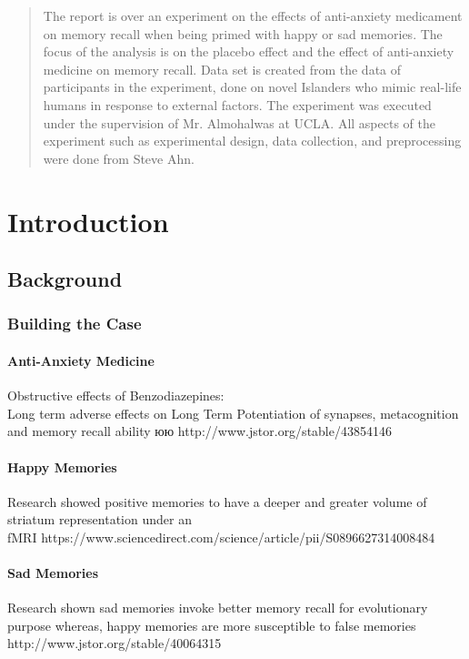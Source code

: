 \documentclass{article}
\begin{document}
    \begin{abstract}
        The report is over an experiment on the effects of anti-anxiety medicament on memory recall when being primed with happy or sad memories. The focus of the analysis is on the placebo effect and the effect of anti-anxiety medicine on memory recall.
        Data set is created from the data of participants in the experiment, done on novel Islanders who mimic real-life humans in response to external factors.
        The experiment was executed under the supervision of Mr. Almohalwas at UCLA. All aspects of the experiment such as experimental design, data collection, and preprocessing were done from Steve Ahn.
    \end{abstract}
    \newpage




    \section{Introduction}\label{sec:introduction}
    \subsection{Background}\label{subsec:background}
    \subsubsection{Building the Case}
    \paragraph{Anti-Anxiety Medicine}
    Obstructive effects of Benzodiazepines:\\
    Long term adverse effects on Long Term Potentiation of synapses, metacognition and memory recall ability юю
    http://www.jstor.org/stable/43854146
    \paragraph{Happy Memories}
    Research showed positive memories to have a deeper and greater volume of striatum representation under an \\
    fMRI https://www.sciencedirect.com/science/article/pii/S0896627314008484
    \paragraph{Sad Memories}
    Research shown sad memories invoke better memory recall for evolutionary \\
    purpose whereas, happy memories are more susceptible to false memories \\
    http://www.jstor.org/stable/40064315
\end{document}
